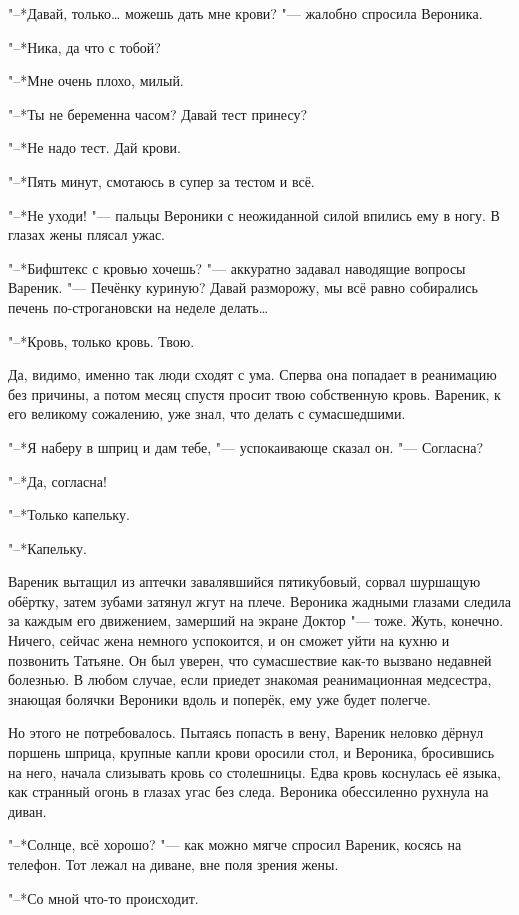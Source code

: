 "--*Давай, только\ldots{} можешь дать мне крови? "--- жалобно спросила Вероника.

"--*Ника, да что с тобой?

"--*Мне очень плохо, милый.

"--*Ты не беременна часом?
Давай тест принесу?

"--*Не надо тест.
Дай крови.

"--*Пять минут, смотаюсь в супер за тестом и всё.

"--*Не уходи! "--- пальцы Вероники с неожиданной силой впились ему в ногу.
В глазах жены плясал ужас.

"--*Бифштекс с кровью хочешь? "--- аккуратно задавал наводящие вопросы Вареник.
"--- Печёнку куриную?
Давай разморожу, мы всё равно собирались печень по-строгановски на неделе делать\ldots{}

"--*Кровь, только кровь.
Твою.

Да, видимо, именно так люди сходят с ума.
Сперва она попадает в реанимацию без причины, а потом месяц спустя просит твою собственную кровь.
Вареник, к его великому сожалению, уже знал, что делать с сумасшедшими.

"--*Я наберу в шприц и дам тебе, "--- успокаивающе сказал он.
"--- Согласна?

"--*Да, согласна!

"--*Только капельку.

"--*Капельку.

Вареник вытащил из аптечки завалявшийся пятикубовый, сорвал шуршащую обёртку, затем зубами затянул жгут на плече.
Вероника жадными глазами следила за каждым его движением, замерший на экране Доктор "--- тоже.
Жуть, конечно.
Ничего, сейчас жена немного успокоится, и он сможет уйти на кухню и позвонить Татьяне.
Он был уверен, что сумасшествие как-то вызвано недавней болезнью.
В любом случае, если приедет знакомая реанимационная медсестра, знающая болячки Вероники вдоль и поперёк, ему уже будет полегче.

Но этого не потребовалось.
Пытаясь попасть в вену, Вареник неловко дёрнул поршень шприца, крупные капли крови оросили стол, и Вероника, бросившись на него, начала слизывать кровь со столешницы.
Едва кровь коснулась её языка, как странный огонь в глазах угас без следа.
Вероника обессиленно рухнула на диван.

"--*Солнце, всё хорошо? "--- как можно мягче спросил Вареник, косясь на телефон.
Тот лежал на диване, вне поля зрения жены.

"--*Со мной что-то происходит.


